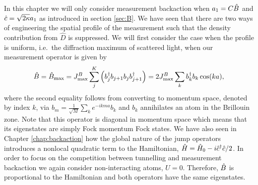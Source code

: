 In this chapter we will only consider measurement backaction when
$a_1 = C \hat{B}$ and $\hat{c} = \sqrt{2 \kappa} a_1$ as introduced in
section \ref{sec:B}. We have seen that there are two ways of
engineering the spatial profile of the measurement such that the
density contribution from $\hat{D}$ is suppressed. We will first
consider the case when the profile is uniform, i.e.~the diffraction
maximum of scattered light, when our measurement operator is given by
\begin{equation}
  \hat{B} = \hat{B}_\mathrm{max} = J^B_\mathrm{max} \sum_j^K \left( b^\dagger_j b_{j+1} b_j
    b^\dagger_{j+1} \right)
  = 2 J^B_\mathrm{max} \sum_k b^\dagger_k b_k \cos(ka),
\end{equation}
where the second equality follows from converting to momentum space,
denoted by index $k$, via
$b_m = \frac{1}{\sqrt{M}} \sum_k e^{-ikma} b_k$ and $b_k$ annihilates
an atom in the Brillouin zone. Note that this operator is diagonal in
momentum space which means that its eigenstates are simply Fock
momentum Fock states. We have also seen in Chapter
\ref{chap:backaction} how the global nature of the jump operators
introduces a nonlocal quadratic term to the Hamiltonian,
$\hat{H} = \hat{H}_0 - i \hat{c}^\dagger \hat{c} / 2$. In order to focus on the
competition between tunnelling and measurement backaction we again
consider non-interacting atoms, $U = 0$. Therefore, $\hat{B}$ is
proportional to the Hamiltonian and both operators have the same
eigenstates.

